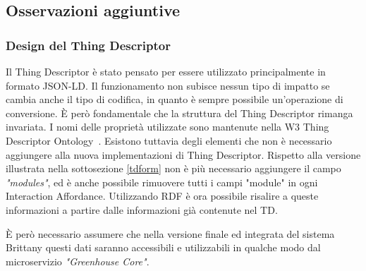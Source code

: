 \subsection{Osservazioni aggiuntive}
\subsubsection{Design del Thing Descriptor}
Il Thing Descriptor è stato pensato per essere utilizzato principalmente in formato JSON-LD. Il funzionamento non subisce nessun tipo di impatto se cambia anche il tipo di codifica, in quanto è sempre possibile un'operazione di conversione. È però fondamentale che la struttura del Thing Descriptor rimanga invariata. I nomi delle proprietà utilizzate sono mantenute nella W3 Thing Descriptor Ontology~\cite{ThingDes54:online}.\newline
\noindent Esistono tuttavia degli elementi che non è necessario aggiungere alla nuova implementazioni di Thing Descriptor. Rispetto alla versione illustrata nella sottosezione \ref{tdform} non è più necessario aggiungere il campo \textit{"modules"}, ed è anche possibile rimuovere tutti i campi "module" in ogni Interaction Affordance.\newline
Utilizzando RDF è ora possibile risalire a queste informazioni a partire dalle informazioni già contenute nel TD.
\begin{warn}
	È però necessario assumere che nella versione finale ed integrata del sistema Brittany questi dati saranno accessibili e utilizzabili in qualche modo dal microservizio \textit{"Greenhouse Core"}.
\end{warn}
